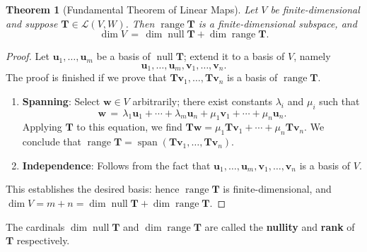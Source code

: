\documentclass[11pt]{article}
\newtheorem{theorem}{Theorem}
\renewcommand{\vec}[1]{\mathbf{#1}}
\newcommand{\mat}[1]{\mathbf{#1}}
\newcommand{\spn}{\operatorname{span}}
\newcommand{\nll}{\operatorname{null}}
\newcommand{\range}{\operatorname{range}}
\begin{document}
\begin{adjustwidth}{0.5cm}{}
  \begin{theorem}[Fundamental Theorem of Linear Maps]
    Let $V$ be finite-dimensional and suppose $\mat{T} \in \mathcal{L}(V, W)$. Then $\range \mat{T}$ is a finite-dimensional subspace, and
    \[
      \dim V \, = \, \dim \nll \mat{T} + \dim \range \mat{T}.
    \]
  \end{theorem}
  \begin{proof}
    Let $\vec{u}_{1}, \ldots, \vec{u}_{m}$ be a basis of $\nll \mat{T}$; extend it to a basis of $V$, namely
    \[
      \vec{u}_{1}, \ldots, \vec{u}_{m}, \vec{v}_{1}, \ldots, \vec{v}_{n}.
    \]
    The proof is finished if we prove that $\mat{T} \vec{v}_{1}, \ldots, \mat{T} \vec{v}_{n}$ is a basis of $\range \mat{T}$.
    \begin{enumerate}
      \item \textbf{Spanning}: Select $\vec{w} \in V$ arbitrarily; there exist constants $\lambda_{i}$ and $\mu_{i}$ such that
      \[
        \vec{w} \, = \, \lambda_{1} \vec{u}_{1} + \cdots + \lambda_{m} \vec{u}_{n} + \mu_{1} \vec{v}_{1} + \cdots + \mu_{n} \vec{u}_{n}.
      \]
      Applying $\mat{T}$ to this equation, we find $\mat{T} \vec{w} = \mu_{1} \mat{T} \vec{v}_{1} + \cdots + \mu_{n} \mat{T} \vec{v}_{n}$. We conclude that $\range \mat{T} = \spn(\mat{T} \vec{v}_{1}, \ldots, \mat{T} \vec{v}_{n})$.
      \item \textbf{Independence}: Follows from the fact that $\vec{u}_{1}, \ldots, \vec{u}_{m}, \vec{v}_{1}, \ldots, \vec{v}_{n}$ is a basis of $V$.
    \end{enumerate}
    This establishes the desired basis: hence $\range \mat{T}$ is finite-dimensional, and $\dim V = m + n = \dim \nll \mat{T} + \dim \range \mat{T}$.
  \end{proof}
\end{adjustwidth}

The cardinals $\dim \nll \mat{T}$ and $\dim \range \mat{T}$ are called the \textbf{nullity} and \textbf{rank} of $\mat{T}$ respectively.
\end{document}
